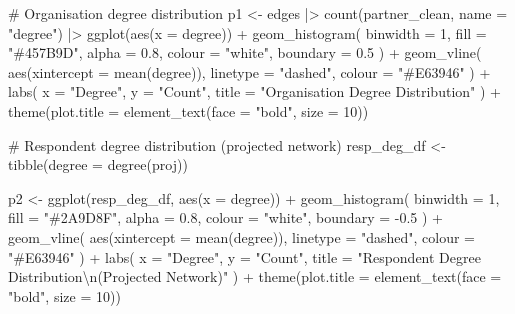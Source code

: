 \documentclass[
  letterpaper,
  DIV=11,
  numbers=noendperiod]{scrartcl}
\newenvironment{Shaded}{\begin{snugshade}}{\end{snugshade}}
\newcommand{\AttributeTok}[1]{\textcolor[rgb]{0.40,0.45,0.13}{#1}}
\newcommand{\CommentTok}[1]{\textcolor[rgb]{0.37,0.37,0.37}{#1}}
\newcommand{\DecValTok}[1]{\textcolor[rgb]{0.68,0.00,0.00}{#1}}
\newcommand{\FloatTok}[1]{\textcolor[rgb]{0.68,0.00,0.00}{#1}}
\newcommand{\FunctionTok}[1]{\textcolor[rgb]{0.28,0.35,0.67}{#1}}
\newcommand{\NormalTok}[1]{\textcolor[rgb]{0.00,0.23,0.31}{#1}}
\newcommand{\OtherTok}[1]{\textcolor[rgb]{0.00,0.23,0.31}{#1}}
\newcommand{\SpecialCharTok}[1]{\textcolor[rgb]{0.37,0.37,0.37}{#1}}
\newcommand{\StringTok}[1]{\textcolor[rgb]{0.13,0.47,0.30}{#1}}
\begin{document}
\begin{Shaded}
\begin{Highlighting}[]
\CommentTok{\# Organisation degree distribution}
\NormalTok{p1 }\OtherTok{\textless{}{-}}\NormalTok{ edges }\SpecialCharTok{|\textgreater{}}
  \FunctionTok{count}\NormalTok{(partner\_clean, }\AttributeTok{name =} \StringTok{"degree"}\NormalTok{) }\SpecialCharTok{|\textgreater{}}
  \FunctionTok{ggplot}\NormalTok{(}\FunctionTok{aes}\NormalTok{(}\AttributeTok{x =}\NormalTok{ degree)) }\SpecialCharTok{+}
  \FunctionTok{geom\_histogram}\NormalTok{(}
    \AttributeTok{binwidth =} \DecValTok{1}\NormalTok{, }\AttributeTok{fill =} \StringTok{"\#457B9D"}\NormalTok{, }\AttributeTok{alpha =} \FloatTok{0.8}\NormalTok{,}
    \AttributeTok{colour =} \StringTok{"white"}\NormalTok{, }\AttributeTok{boundary =} \FloatTok{0.5}
\NormalTok{  ) }\SpecialCharTok{+}
  \FunctionTok{geom\_vline}\NormalTok{(}
    \FunctionTok{aes}\NormalTok{(}\AttributeTok{xintercept =} \FunctionTok{mean}\NormalTok{(degree)),}
    \AttributeTok{linetype =} \StringTok{"dashed"}\NormalTok{, }\AttributeTok{colour =} \StringTok{"\#E63946"}
\NormalTok{  ) }\SpecialCharTok{+}
  \FunctionTok{labs}\NormalTok{(}
    \AttributeTok{x =} \StringTok{"Degree"}\NormalTok{, }\AttributeTok{y =} \StringTok{"Count"}\NormalTok{,}
    \AttributeTok{title =} \StringTok{"Organisation Degree Distribution"}
\NormalTok{  ) }\SpecialCharTok{+}
  \FunctionTok{theme}\NormalTok{(}\AttributeTok{plot.title =} \FunctionTok{element\_text}\NormalTok{(}\AttributeTok{face =} \StringTok{"bold"}\NormalTok{, }\AttributeTok{size =} \DecValTok{10}\NormalTok{))}

\CommentTok{\# Respondent degree distribution (projected network)}
\NormalTok{resp\_deg\_df }\OtherTok{\textless{}{-}} \FunctionTok{tibble}\NormalTok{(}\AttributeTok{degree =} \FunctionTok{degree}\NormalTok{(proj))}

\NormalTok{p2 }\OtherTok{\textless{}{-}} \FunctionTok{ggplot}\NormalTok{(resp\_deg\_df, }\FunctionTok{aes}\NormalTok{(}\AttributeTok{x =}\NormalTok{ degree)) }\SpecialCharTok{+}
  \FunctionTok{geom\_histogram}\NormalTok{(}
    \AttributeTok{binwidth =} \DecValTok{1}\NormalTok{, }\AttributeTok{fill =} \StringTok{"\#2A9D8F"}\NormalTok{, }\AttributeTok{alpha =} \FloatTok{0.8}\NormalTok{,}
    \AttributeTok{colour =} \StringTok{"white"}\NormalTok{, }\AttributeTok{boundary =} \SpecialCharTok{{-}}\FloatTok{0.5}
\NormalTok{  ) }\SpecialCharTok{+}
  \FunctionTok{geom\_vline}\NormalTok{(}
    \FunctionTok{aes}\NormalTok{(}\AttributeTok{xintercept =} \FunctionTok{mean}\NormalTok{(degree)),}
    \AttributeTok{linetype =} \StringTok{"dashed"}\NormalTok{, }\AttributeTok{colour =} \StringTok{"\#E63946"}
\NormalTok{  ) }\SpecialCharTok{+}
  \FunctionTok{labs}\NormalTok{(}
    \AttributeTok{x =} \StringTok{"Degree"}\NormalTok{, }\AttributeTok{y =} \StringTok{"Count"}\NormalTok{,}
    \AttributeTok{title =} \StringTok{"Respondent Degree Distribution}\SpecialCharTok{\textbackslash{}n}\StringTok{(Projected Network)"}
\NormalTok{  ) }\SpecialCharTok{+}
  \FunctionTok{theme}\NormalTok{(}\AttributeTok{plot.title =} \FunctionTok{element\_text}\NormalTok{(}\AttributeTok{face =} \StringTok{"bold"}\NormalTok{, }\AttributeTok{size =} \DecValTok{10}\NormalTok{))}


\end{Highlighting}
\end{Shaded}
\end{document}
